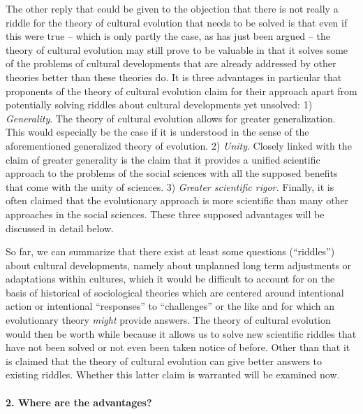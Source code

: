 The other reply that could be given to the objection that there is not really
a riddle for the theory of cultural evolution that needs to be solved is that
even if this were true -- which is only partly the case, as has just been
argued -- the theory of cultural evolution may still prove to be valuable in
that it solves some of the problems of cultural developments that are already
addressed by other theories better than these theories do. It is three
advantages in particular that proponents of the theory of cultural evolution
claim for their approach apart from potentially solving riddles about
cultural developments yet unsolved: 1) {\em Generality}. The theory of
cultural evolution allows for greater generalization. This would especially be
the case if it is understood in the sense of the aforementioned generalized
theory of evolution. 2) {\em Unity}. Closely linked with the claim of greater
generality is the claim that it provides a unified scientific approach to the
problems of the social sciences with all the supposed benefits that come with
the unity of sciences.  3) {\em Greater scientific rigor.} Finally, it is often
claimed that the evolutionary approach is more scientific than many other
approaches in the social sciences. These three supposed advantages will be
discussed in detail below.

So far, we can summarize that there exist at least some questions (``riddles'')
about cultural developments, namely about unplanned long term adjustments or
adaptations within cultures, which it would be difficult to account for on the
basis of historical of sociological theories which are centered around
intentional action or intentional ``responses'' to ``challenges'' or the like
and for which an evolutionary theory {\em might} provide answers. The theory
of cultural evolution would then be worth while because it allows us to solve
new scientific riddles that have not been solved or not even been taken notice
of before. Other than that it is claimed that the theory of cultural evolution
can give better answers to existing riddles. Whether this latter claim is
warranted will be examined now.

\paragraph{2. Where are the advantages?}

